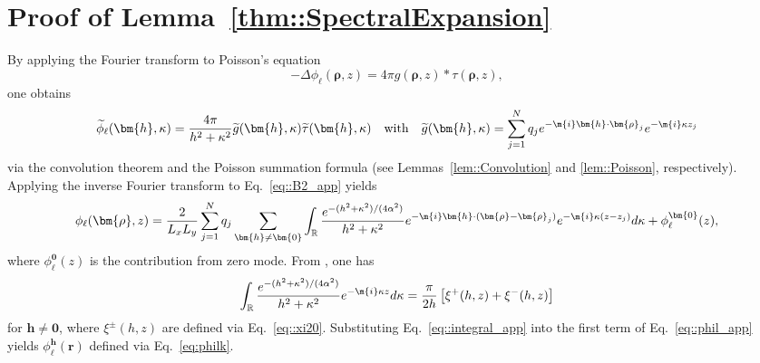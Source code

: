 \section{Proof of Lemma~\ref{thm::SpectralExpansion}}\label{app::deriv}
By applying the Fourier transform to Poisson's equation
\begin{equation}\label{eq::B.1_app}
	-\Delta\phi_{\ell}(\bm{\rho},z)=4\pi g(\bm{\rho},z)\ast\tau(\bm{\rho},z),
\end{equation}
one obtains  
\begin{equation}\label{eq::B2_app}
	\widetilde{\phi}_{\ell}(\bm{h},\kappa)=\frac{4\pi}{h^2+\kappa^2}\widetilde{g}(\bm{h},\kappa)\widetilde{\tau}(\bm{h},\kappa)\quad\text{with}\quad \widetilde{g}(\bm{h},\kappa)=\sum_{j=1}^{N}q_{j} e^{-\m{i} \bm{h}\cdot\bm{\rho}_{j}}e^{-\m{i} \kappa z_{j}}
\end{equation}
via the convolution theorem and the Poisson summation formula (see Lemmas~\ref{lem::Convolution} and \ref{lem::Poisson}, respectively). Applying the inverse Fourier transform to Eq.~\eqref{eq::B2_app} yields
\begin{equation}\label{eq::phil_app}
	\phi_{\ell}(\bm{\rho},z)=\frac{2}{L_xL_y}\sum_{j=1}^{N}q_{j}\sum_{\bm{h}\neq\bm{0}}\int_{\mathbb{R}}\frac{e^{-(h^2+\kappa^2)/(4\alpha^2)}}{h^2+\kappa^2}e^{-\m{i} \bm{h}\cdot(\bm{\rho}-\bm{\rho}_{j})}e^{-\m{i} \kappa(z-z_{j})}d\kappa + \phi^{\bm{0}}_{\ell}(z),
\end{equation}
where $\phi^{\bm{0}}_{\ell}(z)$ is the contribution from zero mode. From \cite{oberhettinger2012tables}, one has 
\begin{equation}\label{eq::integral_app}
	\int_{\mathbb{R}} \frac{e^{-(h^2+\kappa^2)/(4\alpha^2)}}{h^2+\kappa^2} e^{-\m{i} \kappa z} d\kappa = \frac{\pi}{2h} \left[\xi^{+}(h,z)+\xi^{-}(h,z)\right]
\end{equation}
for $\bm{h}\neq\bm{0}$, where $\xi^{\pm}(h,z)$ are defined via Eq.~\eqref{eq::xi20}. Substituting Eq.~\eqref{eq::integral_app} into the first term of Eq.~\eqref{eq::phil_app} yields $\phi_{\ell}^{\bm{h}}(\bm{r})$ defined via Eq.~\eqref{eq:philk}.

